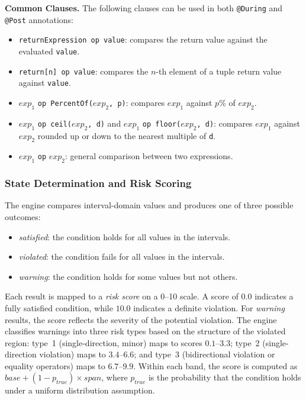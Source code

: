 \documentclass[pdflatex,sn-basic]{sn-jnl}%
\theoremstyle{thmstyleone}%
\theoremstyle{thmstyletwo}%
\theoremstyle{thmstylethree}%
\begin{document}
\smallskip
\noindent\textbf{Common Clauses.}
The following clauses can be used in both \texttt{@During} and \texttt{@Post} annotations:
\begin{itemize}
    \item \texttt{returnExpression op value}: compares the return value against the evaluated \texttt{value}.

    \item \texttt{return[n] op value}: compares the $n$-th element of a tuple return value against \texttt{value}.

    \item $\mathit{exp}_1$ \texttt{op PercentOf(}$\mathit{exp}_2$\texttt{, p)}: compares $\mathit{exp}_1$ against $p$\% of $\mathit{exp}_2$.

    \item $\mathit{exp}_1$ \texttt{op ceil(}$\mathit{exp}_2$\texttt{, d)} and $\mathit{exp}_1$ \texttt{op floor(}$\mathit{exp}_2$\texttt{, d)}: compares $\mathit{exp}_1$ against $\mathit{exp}_2$ rounded up or down to the nearest multiple of \texttt{d}.

    \item $\mathit{exp}_1$ \texttt{op} $\mathit{exp}_2$: general comparison between two expressions.
\end{itemize}

\subsubsection{State Determination and Risk Scoring}
The engine compares interval-domain values and produces one of three possible outcomes:
\begin{itemize}
    \item \textit{satisfied}: the condition holds for all values in the intervals.
    \item \textit{violated}: the condition fails for all values in the intervals.
    \item \textit{warning}: the condition holds for some values but not others.
\end{itemize}

Each result is mapped to a \textit{risk score} on a 0--10 scale.
A score of $0.0$ indicates a fully satisfied condition, while $10.0$ indicates a definite violation.
For \textit{warning} results, the score reflects the severity of the potential violation.
The engine classifies warnings into three risk types based on the structure of the violated region:
type~1 (single-direction, minor) maps to scores $0.1$--$3.3$;
type~2 (single-direction violation) maps to $3.4$--$6.6$;
and type~3 (bidirectional violation or equality operators) maps to $6.7$--$9.9$.
Within each band, the score is computed as $\mathit{base} + (1 - p_{\mathit{true}}) \times \mathit{span}$, where $p_{\mathit{true}}$ is the probability that the condition holds under a uniform distribution assumption.
\end{document}
